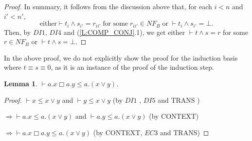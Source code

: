 \documentclass{elsarticle}
\theoremstyle{plain}
\newtheorem{lemma}[theorem]{Lemma}
\theoremstyle{definition}
\begin{document}
\begin{proof}
     In summary, it follows from the discussion above that, for each $i<n$ and $i'<n'$,
     \[\text{either} \vdash t_{i} \wedge s_{i'}= r_{ii'}\;\text{for some}\;r_{ii'}\in NF_{B}\;\text{or}\; \vdash t_{i} \wedge s_{i'}= \bot.\]
     Then, by $DI1$, $DI4$ and (\ref{L:COMP_CONJ}.1), we get either $\vdash t \wedge s = r$ for some $r \in NF_{B}$ or $\vdash t \wedge s= \bot$.
\end{proof}


In the above proof, we do not  explicitly show the proof for the induction basis where $t \equiv s \equiv 0$, as it is an instance of the proof of the induction step.

\begin{lemma}\label{L:SP3}
      $\vdash a.x \Box a.y  \leqslant a.(x \vee y) $.
\end{lemma}
\begin{proof}
$ \vdash x  \leqslant x \vee y$ and $\vdash y  \leqslant x \vee y$   \qquad\;\;\;\;\; (by  $DI1$ ,  $DI5$ and TRANS )

\noindent $\Rightarrow   \vdash a.x  \leqslant a.(x \vee y)$ and $\vdash a.y  \leqslant a.(x \vee y)$  \;\qquad\qquad\qquad\;  (by CONTEXT)

\noindent $\Rightarrow   \vdash a.x \Box a.y \leqslant a.(x \vee y)$ \qquad\qquad\qquad (by CONTEXT,  $EC3$ and TRANS)
\end{proof}
\end{document}
